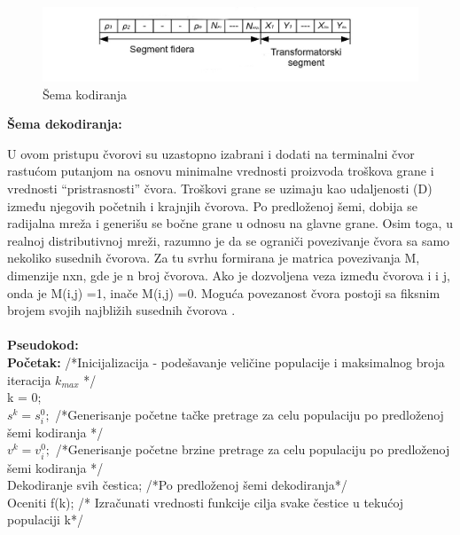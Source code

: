 \documentclass[a4paper]{article}
\begin{document}
\begin{figure}[htp]
    \centering
    \includegraphics[scale=0.3]{foto4.jpg}
    \caption{Šema kodiranja}
    \label{fig:sema_kodiranja}
\end{figure}

\begin{flushleft}
\textbf{Šema dekodiranja:} 
\end{flushleft}

U ovom pristupu čvorovi su uzastopno izabrani i dodati na terminalni čvor rastućom putanjom na osnovu minimalne vrednosti proizvoda troškova grane i vrednosti “pristrasnosti” čvora. Troškovi grane se uzimaju kao udaljenosti (D) između njegovih početnih i krajnjih čvorova. Po predloženoj šemi, dobija se radijalna mreža i generišu se bočne grane u odnosu na glavne grane. Osim toga, u realnoj distributivnoj mreži, razumno je da se ograniči povezivanje čvora sa samo nekoliko susednih čvorova. Za tu svrhu formirana je matrica povezivanja M, dimenzije nxn, gde je n broj čvorova. Ako je dozvoljena veza između čvorova i i j, onda je M(i,j) =1, inače  M(i,j) =0. Moguća povezanost čvora postoji sa fiksnim brojem svojih najbližih susednih čvorova \cite{inproceedings}.\\
\\ 
\textbf{Pseudokod:} \\ 
\textbf{Početak:} /*Inicijalizacija - podešavanje veličine populacije i maksimalnog broja iteracija $k_{max}$ */ \\
\hspace*{5mm}k = 0; \\
\hspace*{5mm}$s^k = s_{i}^0;$  /*Generisanje početne tačke pretrage za celu populaciju po predloženoj šemi kodiranja */ \\
\hspace*{5mm}$v^k = v_{i}^0;$  /*Generisanje početne brzine pretrage za celu populaciju po predloženoj šemi kodiranja */ \\
\hspace*{5mm}Dekodiranje svih čestica; /*Po predloženoj šemi dekodiranja*/ \\
\hspace*{5mm}Oceniti f(k); /* Izračunati vrednosti funkcije cilja svake čestice u tekućoj populaciji k*/ \\
\end{document}
